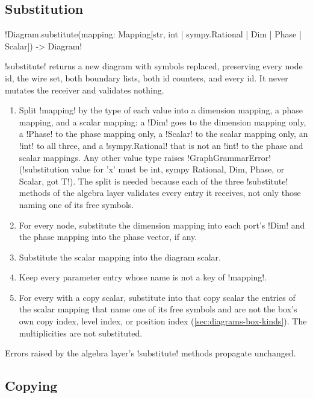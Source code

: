 \subsection{Substitution}

\begin{signature}
\py!Diagram.substitute(mapping: Mapping[str, int | sympy.Rational | Dim | Phase | Scalar]) -> Diagram!
\end{signature}

\py!substitute! returns a new diagram with symbols replaced, preserving every node id, the wire set, both boundary lists, both id counters, and every \bbox{} id. It never mutates the receiver and validates nothing.

\begin{algorithm}\label{alg:diagrams-substitute}
\begin{enumerate}
\item Split \py!mapping! by the type of each value into a dimension mapping, a phase mapping, and a scalar mapping: a \py!Dim! goes to the dimension mapping only, a \py!Phase! to the phase mapping only, a \py!Scalar! to the scalar mapping only, an \py!int! to all three, and a \py!sympy.Rational! that is not an \py!int! to the phase and scalar mappings. Any other value type raises \py!GraphGrammarError! (\code!substitution value for 'x' must be int, sympy Rational, Dim, Phase, or Scalar, got T!). The split is needed because each of the three \py!substitute! methods of the algebra layer validates every entry it receives, not only those naming one of its free symbols.
\item For every node, substitute the dimension mapping into each port's \py!Dim! and the phase mapping into the phase vector, if any.
\item Substitute the scalar mapping into the diagram scalar.
\item Keep every parameter entry whose name is not a key of \py!mapping!.
\item For every \bbox{} with a copy scalar, substitute into that copy scalar the entries of the scalar mapping that name one of its free symbols and are not the box's own copy index, level index, or position index (\cref{sec:diagrams-box-kinds}). The \bbox{} multiplicities are not substituted.
\end{enumerate}
Errors raised by the algebra layer's \py!substitute! methods propagate unchanged.
\end{algorithm}

\subsection{Copying}

